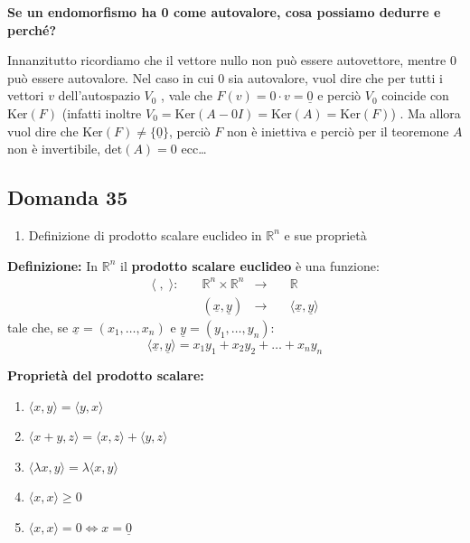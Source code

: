 \documentclass[
  a4paper,
]{article}
\providecommand{\tightlist}{%
  \setlength{\itemsep}{0pt}\setlength{\parskip}{0pt}}
\providecommand{\tightlist}{}
\begin{document}
\bigskip

\textbf{Se un endomorfismo ha 0 come autovalore, cosa possiamo dedurre e
perché?}

Innanzitutto ricordiamo che il vettore nullo non può essere autovettore,
mentre 0 può essere autovalore. Nel caso in cui 0 sia autovalore, vuol
dire che per tutti i vettori \(v\) dell'autospazio \(V_0\) , vale che
\(F(v) = 0 \cdot v = \underline{0}\) e perciò \(V_0\) coincide con
\(\text{Ker}(F)\) (infatti inoltre
\(V_0 = \text{Ker}(A - 0I )= \text{Ker}(A)=\text{Ker}(F)\)) . Ma allora
vuol dire che \(\text{Ker}(F) \neq \{\underline{0}\}\), perciò \(F\) non
è iniettiva e perciò per il teoremone \(A\) non è invertibile,
\(\text{det}(A) = 0\) ecc\ldots{}

\hypertarget{domanda-35}{%
\subsection{Domanda 35}\label{domanda-35}}

\begin{observationbox}[Domanda]
\begin{enumerate}
\def\labelenumi{\arabic{enumi}.}
\setcounter{enumi}{34}
\tightlist
\item
  Definizione di prodotto scalare euclideo in \(\mathbb{R}^n\) e sue
  proprietà
\end{enumerate}
\end{observationbox}

\textbf{Definizione:} In \(\mathbb{R}^n\) il \textbf{prodotto scalare
euclideo} è una funzione: \[
\begin{aligned}
\langle \; , \; \rangle: \quad &\mathbb{R}^n \times \mathbb{R}^n &\to& \quad \mathbb{R} \\
&(\underline{x}, \underline{y}) &\to& \quad\langle \underline{x} , \underline{y} \rangle
\end{aligned}
\] tale che, se \(\underline{x} = (x_1, \dots, x_n)\) e
\(\underline{y} = (y_1, \dots, y_n)\): \[
\langle \underline{x} , \underline{y} \rangle = x_1y_1 + x_2y_2 + \dots + x_ny_n
\]

\textbf{Proprietà del prodotto scalare:}

\begin{enumerate}
\def\labelenumi{\arabic{enumi}.}
\tightlist
\item
  \(\langle x, y \rangle = \langle y, x \rangle\)
\item
  \(\langle x + y, z \rangle =\langle x, z \rangle +\langle y, z \rangle\)
\item
  \(\langle \lambda x, y \rangle = \lambda \langle x, y \rangle\)
\item
  \(\langle x, x \rangle \ge 0\)
\item
  \(\langle x, x \rangle = 0 \iff x = \underline{0}\)
\end{enumerate}
\end{document}
